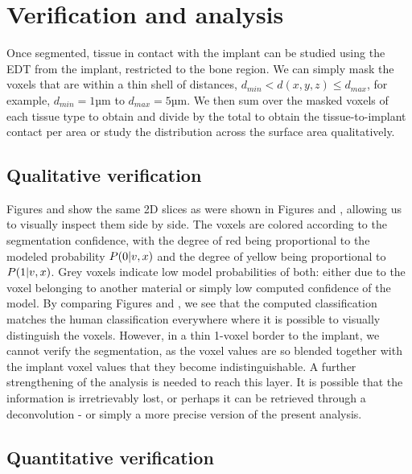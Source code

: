 \section{Verification and analysis}
\label{sec:verification}

Once segmented, tissue in contact with the implant can be studied using the EDT
from the implant, restricted to the bone region. We can simply mask the voxels
that are within a thin shell of distances, $d_{min} < d(x,y,z) \le d_{max}$,
for example, $d_{min} = 1 \text{µm}$ to $d_{max} = 5 \text{µm}$. We then sum
over the masked voxels of each tissue type to obtain and divide by the total to
obtain the tissue-to-implant contact per area or study the distribution across
the surface area qualitatively.


\subsection{Qualitative verification}

Figures  and 
show the same 2D slices as were shown in Figures  and
, allowing us to visually inspect them side by side. The voxels
are colored according to the segmentation confidence, with the degree of red
being proportional to the modeled probability $P\!\left(0\middle\vert v,x\right)$ and the degree
of yellow being proportional to $P\!\left(1\middle\vert v,x\right)$. Grey voxels indicate low
model probabilities of both: either due to the voxel belonging to another
material or simply low computed confidence of the model. By comparing Figures
 and , we see
that the computed classification matches the human classification everywhere
where it is possible to visually distinguish the voxels. However, in a thin
1-voxel border to the implant, we cannot verify the segmentation, as the voxel
values are so blended together with the implant voxel values that they become
indistinguishable. A further strengthening of the analysis is needed to reach
this layer. It is possible that the information is irretrievably lost, or
perhaps it can be retrieved through a deconvolution - or simply a more precise
version of the present analysis.

\subsection{Quantitative verification}
